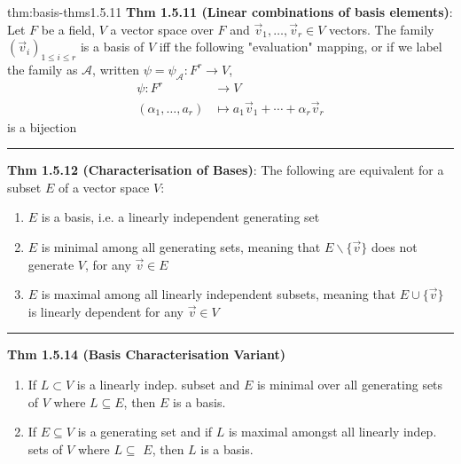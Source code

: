 \documentclass[landscape, 8pt]{extarticle}
\begin{document}
\begin{multicols}{3}
\begin{thm}{thm:basis-thms}{1.5.11}
    \vspace{-5pt}
    \textbf{Thm 1.5.11 (Linear combinations of basis elements)}: Let $F$ be a field, $V$ a vector space over $F$ and $\vec{v}_{1},\dots,\vec{v}_{r}\in V$ vectors. The family $(\vec{v}_{i})_{1\le i\le r}$ is a basis of $V$ iff the following "evaluation" mapping, or if we label the family as $\mathcal{A}$, written $\psi = \psi_{\mathcal{A}} : F^{r}\to V$,
    \begin{align*}
        \psi : F^{r} &\to V\\
        (\alpha_{1},\dots,a_{r}) &\mapsto a_{1}\vec{v}_{1} + \cdots + \alpha_{r}\vec{v}_{r}
    \end{align*}
    is a bijection

    \vspace{-5pt}
    \noindent\rule{\textwidth}{0.2pt}

    \textbf{Thm 1.5.12 (Characterisation of Bases)}: The following are equivalent for a subset $E$ of a vector space $V$:
    \vspace{-5pt}
    \begin{enumerate}
        \setlength\itemsep{0em}
        \item $E$ is a basis, i.e. a linearly independent generating set
        \item $E$ is minimal among all generating sets, meaning that $E \backslash \{\vec{v}\}$ does not generate $V$, for any $\vec{v}\in E$
        \item $E$ is maximal among all linearly independent subsets, meaning that $E \cup \{\vec{v}\}$ is linearly dependent for any $\vec{v}\in V$
    \end{enumerate}

    \vspace{-10pt}
    \noindent\rule{\textwidth}{0.2pt}
    \textbf{Thm 1.5.14 (Basis Characterisation Variant)}
    \vspace{-5pt}
    \begin{enumerate}
        \setlength\itemsep{0em}
        \item If $L \subset V$ is a linearly indep. subset and $E$ is minimal over all generating sets of $V$ where $L \subseteq E$, then $E$ is a basis.
        \item If $E \subseteq V$ is a generating set and if $L$ is maximal amongst all linearly indep. sets of $V$ where $L \subseteq$ $E$, then $L$ is a basis.
    \end{enumerate}


\end{thm}
\end{multicols}
\end{document}
